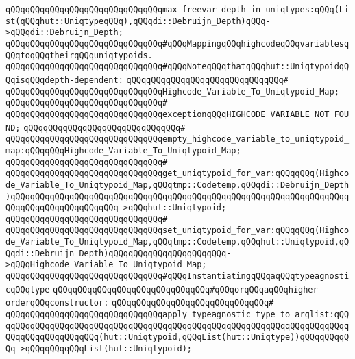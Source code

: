 \verb|qQQqqQQqqQQqqQQqqQQqqQQqqQQqqQQqmax_freevar_depth_in_uniqtypes:qQQq(List(qQQqhut::UniqtypeqQQq),qQQqdi::Debruijn_Depth)qQQq->qQQqdi::Debruijn_Depth;|\newline
\newline
\newline
\verb|qQQqqQQqqQQqqQQqqQQqqQQqqQQqqQQq#qQQqMappingqQQqhighcodeqQQqvariablesqQQqtoqQQqtheirqQQquniqtypoids.|\newline
\verb|qQQqqQQqqQQqqQQqqQQqqQQqqQQqqQQq#qQQqNoteqQQqthatqQQqhut::UniqtypoidqQQqisqQQqdepth-dependent:|\newline
\verb|qQQqqQQqqQQqqQQqqQQqqQQqqQQqqQQq#|\newline
\verb|qQQqqQQqqQQqqQQqqQQqqQQqqQQqqQQqHighcode_Variable_To_Uniqtypoid_Map;|\newline
\verb|qQQqqQQqqQQqqQQqqQQqqQQqqQQqqQQq#|\newline
\verb|qQQqqQQqqQQqqQQqqQQqqQQqqQQqqQQqexceptionqQQqHIGHCODE_VARIABLE_NOT_FOUND;|\newline
\verb|qQQqqQQqqQQqqQQqqQQqqQQqqQQqqQQq#|\newline
\verb|qQQqqQQqqQQqqQQqqQQqqQQqqQQqqQQqempty_highcode_variable_to_uniqtypoid_map:qQQqqQQqHighcode_Variable_To_Uniqtypoid_Map;|\newline
\verb|qQQqqQQqqQQqqQQqqQQqqQQqqQQqqQQq#|\newline
\verb|qQQqqQQqqQQqqQQqqQQqqQQqqQQqqQQqget_uniqtypoid_for_var:qQQqqQQq(Highcode_Variable_To_Uniqtypoid_Map,qQQqtmp::Codetemp,qQQqdi::Debruijn_Depth)qQQqqQQqqQQqqQQqqQQqqQQqqQQqqQQqqQQqqQQqqQQqqQQqqQQqqQQqqQQqqQQqqQQqqQQqqQQqqQQqqQQqqQQqqQQq->qQQqhut::Uniqtypoid;|\newline
\verb|qQQqqQQqqQQqqQQqqQQqqQQqqQQqqQQq#|\newline
\verb|qQQqqQQqqQQqqQQqqQQqqQQqqQQqqQQqset_uniqtypoid_for_var:qQQqqQQq(Highcode_Variable_To_Uniqtypoid_Map,qQQqtmp::Codetemp,qQQqhut::Uniqtypoid,qQQqdi::Debruijn_Depth)qQQqqQQqqQQqqQQqqQQqqQQq->qQQqHighcode_Variable_To_Uniqtypoid_Map;|\newline
\newline
\newline
\newline
\verb|qQQqqQQqqQQqqQQqqQQqqQQqqQQqqQQq#qQQqInstantiatingqQQqaqQQqtypeagnosticqQQqtype|\newline
\verb|qQQqqQQqqQQqqQQqqQQqqQQqqQQqqQQq#qQQqorqQQqaqQQqhigher-orderqQQqconstructor:|\newline
\verb|qQQqqQQqqQQqqQQqqQQqqQQqqQQqqQQq#|\newline
\verb|qQQqqQQqqQQqqQQqqQQqqQQqqQQqqQQqapply_typeagnostic_type_to_arglist:qQQqqQQqqQQqqQQqqQQqqQQqqQQqqQQqqQQqqQQqqQQqqQQqqQQqqQQqqQQqqQQqqQQqqQQqqQQqqQQqqQQqqQQqqQQq(hut::Uniqtypoid,qQQqList(hut::Uniqtype))qQQqqQQqqQQq->qQQqqQQqqQQqList(hut::Uniqtypoid);|\newline
